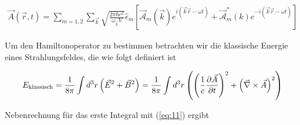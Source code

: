 \begin{align}
  \label{eq:11}
    \vec A(\vec r, t) =  \sum_{m=1,2} \sum_{\vec k} \sqrt{\frac{2\pi\hbar c^2}{\omega_{\vec k}V}}  \hat \epsilon_m  \left[  \vec{\mathcal A}_m (\vec k)  e^{i(\vec k\vec r-\omega t)} + \vec{\mathcal A}^*_m (k) e^{-i(\vec k\vec r-\omega t)}\right]
\end{align}


Um den Hamiltonoperator zu bestimmen betrachten wir die klassische Energie eines Strahlungsfeldes, die wie folgt definiert ist

\begin{align}
  \label{eq:12}
  E_{\text{klassisch}} = \frac{1}{8\pi} \int d^3r \left( \vec E^2+\vec B^2 \right) = \frac{1}{8\pi} \int d^3r \left( \left( \frac{1}{c} \pdiff{\vec A}_t \right)^2 + \left(\vec \nabla\times\vec A\right)^2 \right)
\end{align}

Nebenrechnung für das erste Integral mit (\ref{eq:11}) ergibt

